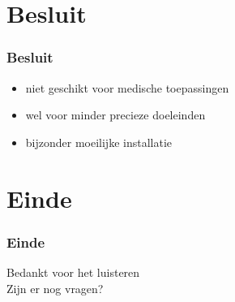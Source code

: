 \documentclass
   [kulak] %
   {kulakbeamer}
\begin{document}
\section{Besluit}

\begin{frame}
\frametitle{Besluit}
\begin{itemize}
	\item niet geschikt voor medische toepassingen
	\item wel voor minder precieze doeleinden
	\item bijzonder moeilijke installatie
\end{itemize}
\end{frame}

\section*{Einde}
\begin{frame}
\frametitle{Einde}
\begin{center}
	Bedankt voor het luisteren\\
	Zijn er nog vragen?
\end{center}
\end{frame}
\end{document}
